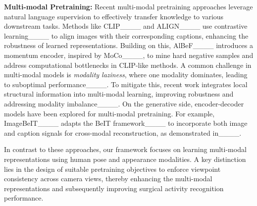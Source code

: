 \noindent \textbf{Multi-modal Pretraining:} Recent multi-modal pretraining approaches leverage natural language supervision to effectively transfer knowledge to various downstream tasks. Methods like CLIP____ and ALIGN____ use contrastive learning____ to align images with their corresponding captions, enhancing the robustness of learned representations. Building on this, AlBeF____ introduces a momentum encoder, inspired by MoCo____, to mine hard negative samples and address computational bottlenecks in CLIP-like methods. A common challenge in multi-modal models is \emph{modality laziness}, where one modality dominates, leading to suboptimal performance____. To mitigate this, recent work integrates local structural information into multi-modal learning, improving robustness and addressing modality imbalance____. On the generative side, encoder-decoder models have been explored for multi-modal pretraining. For example, ImageBeIT____ adapts the BeIT framework____ to incorporate both image and caption signals for cross-modal reconstruction, as demonstrated in____.

In contrast to these approaches, our framework focuses on learning multi-modal representations using human pose and appearance modalities. A key distinction lies in the design of suitable pretraining objectives to enforce viewpoint consistency across camera views, thereby enhancing the multi-modal representations and subsequently improving surgical activity recognition performance.